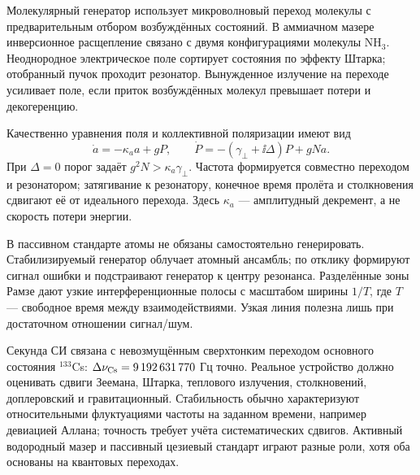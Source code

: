 
Молекулярный генератор использует микроволновый переход молекулы с предварительным отбором возбуждённых состояний. В аммиачном мазере инверсионное расщепление связано с двумя конфигурациями молекулы NH$_3$. Неоднородное электрическое поле сортирует состояния по эффекту Штарка; отобранный пучок проходит резонатор. Вынужденное излучение на переходе усиливает поле, если приток возбуждённых молекул превышает потери и декогеренцию.

Качественно уравнения поля и коллективной поляризации имеют вид
\begin{equation}
 \dot a=-\kappa_a a+gP,\qquad
 \dot P=-(\gamma_\perp+\ii\Delta)P+gNa.
\end{equation}
При $\Delta=0$ порог задаёт $g^2N>\kappa_a\gamma_\perp$. Частота формируется совместно переходом и резонатором; затягивание к резонатору, конечное время пролёта и столкновения сдвигают её от идеального перехода. Здесь $\kappa_a$ — амплитудный декремент, а не скорость потери энергии.

В пассивном стандарте атомы не обязаны самостоятельно генерировать. Стабилизируемый генератор облучает атомный ансамбль; по отклику формируют сигнал ошибки и подстраивают генератор к центру резонанса. Разделённые зоны Рамзе дают узкие интерференционные полосы с масштабом ширины $1/T$, где $T$ — свободное время между взаимодействиями. Узкая линия полезна лишь при достаточном отношении сигнал/шум.

Секунда СИ связана с невозмущённым сверхтонким переходом основного состояния $^{133}$Cs: $\Delta\nu_{\rm Cs}=9\,192\,631\,770$ Гц точно. Реальное устройство должно оценивать сдвиги Зеемана, Штарка, теплового излучения, столкновений, доплеровский и гравитационный. Стабильность обычно характеризуют относительными флуктуациями частоты на заданном времени, например девиацией Аллана; точность требует учёта систематических сдвигов. Активный водородный мазер и пассивный цезиевый стандарт играют разные роли, хотя оба основаны на квантовых переходах.
